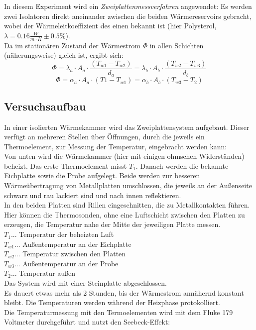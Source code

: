 \documentclass[12pt,a4paper]{article}
\begin{document}
\begin{multicols}{2}
\noindent In diesem Experiment wird ein \emph{Zweiplattenmessverfahren} angewendet: Es werden zwei Isolatoren direkt aneinander zwischen die beiden Wärmereservoirs gebracht, wobei der Wärmeleitkoeffizient des einen bekannt ist (hier Polysterol, $\lambda = 0.16 \frac{W}{m \cdot K}\pm 0.5\%$).\\
Da im stationären Zustand der Wärmestrom $\Phi$ in allen Schichten (näherungsweise) gleich ist, ergibt sich:
$$\Phi=\lambda_a \cdot A_a \cdot \frac{(T_{w1}-T_{w2})}{d_a}=\lambda_b \cdot A_b \cdot \frac{(T_{w2}-T_{w3})}{d_b}$$
$$\Phi = \alpha_a \cdot A_a \cdot (T1-T_{w1}) = \alpha_b \cdot A_b \cdot (T_{w3}-T_2) $$


\subsection{Versuchsaufbau}
In einer isolierten Wärmekammer wird das Zweiplattensystem aufgebaut. Dieser verfügt an mehreren Stellen über Öffnungen, durch die jeweils ein Thermoelement, zur Messung der Temperatur, eingebracht werden kann:\\
Von unten wird die Wärmekammer (hier mit einigen ohmschen Widerständen) beheizt. Das erste Thermoelement misst $T_1$.
Danach werden die bekannte Eichplatte sowie die Probe aufgelegt. Beide werden zur besseren Wärmeübertragung von Metallplatten umschlossen, die jeweils an der Außenseite schwarz und rau lackiert sind und nach innen reflektieren.\\
In den beiden Platten sind Rillen eingeschnitten, die zu Metallkontakten führen. Hier können die Thermosonden, ohne eine Luftschicht zwischen den Platten zu erzeugen, die Temperatur nahe der Mitte der jeweiligen Platte messen.\\

\noindent  $T_1$... Temperatur der beheizten Luft\\
$T_{w1}$... Außentemperatur an der Eichplatte\\
$T_{w2}$... Temperatur zwischen den Platten\\
$T_{w3}$... Außentemperatur an der Probe\\
$T_2$... Temperatur außen\\

\noindent Das System wird mit einer Steinplatte abgeschlossen.\\
Es dauert etwas mehr als 2 Stunden, bis der Wärmestrom annähernd konstant bleibt. Die Temperaturen werden während der Heizphase protokolliert.\\

\noindent Die Temperaturmessung mit den Termoelementen wird mit dem Fluke 179 Voltmeter durchgeführt und nutzt den Seebeck-Effekt:\\

\end{multicols}
\end{document}
